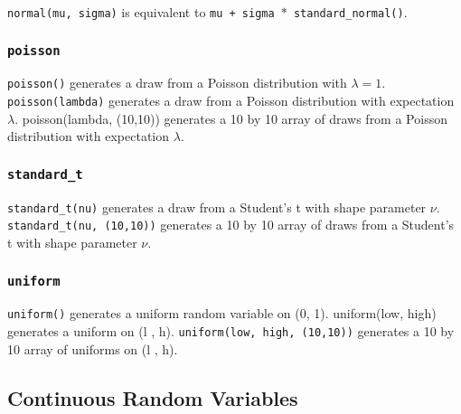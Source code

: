\documentclass[KSmain.tex]{subfiles}
\begin{document}
\texttt{normal(mu, sigma)} is equivalent to \texttt{mu + sigma $\ast$ standard\_normal()}.
\subsubsection{\texttt{poisson}}
\texttt{poisson()} generates a draw from a Poisson distribution with $\lambda = 1$. \texttt{poisson(lambda)} generates a draw
from a Poisson distribution with expectation $\lambda$. poisson(lambda, (10,10)) generates a 10 by 10 array of
draws from a Poisson distribution with expectation $\lambda$.
\subsubsection{\texttt{standard\_t}}
\texttt{standard\_t(nu)} generates a draw from a Student’s t with shape parameter $\nu$. \texttt{standard\_t(nu, (10,10))}
generates a 10 by 10 array of draws from a Student’s t with shape parameter $\nu$.
\subsubsection{\texttt{uniform}}
\texttt{uniform()} generates a uniform random variable on (0, 1). uniform(low, high) generates a uniform on
(l , h). \texttt{uniform(low, high, (10,10))} generates a 10 by 10 array of uniforms on (l , h).
\newpage


\subsection{Continuous Random Variables}
\end{document}
